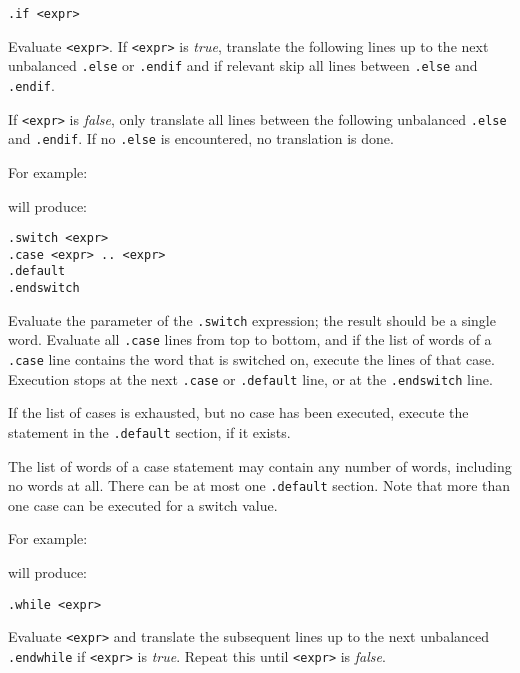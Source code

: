 \begin{verbatim}
.if <expr>
\end{verbatim}
\begin{desc}
Evaluate \texttt{<expr>}.
If \texttt{<expr>} is {\it true},
translate the following lines up to the next unbalanced
\texttt{.else} or \texttt{.endif}
and if relevant skip all lines between \texttt{.else} and \texttt{.endif}.

If \texttt{<expr>} is {\it false},
only translate all lines between the following unbalanced
\texttt{.else} and \texttt{.endif}.
If no \texttt{.else} is encountered, no translation is done.

For example:
\begin{showfile}

\end{showfile}
will produce:
\begin{showfile}

\end{showfile}
\end{desc}
\begin{verbatim}
.switch <expr>
.case <expr> .. <expr>
.default
.endswitch
\end{verbatim}
\begin{desc}
Evaluate the parameter of the \verb'.switch' expression; the result
should be a single word. Evaluate all \verb'.case' lines from top
to bottom, and if the list of words of a \verb'.case' line contains
the word that is switched on, execute the lines of that case.
Execution stops at the next \verb'.case' or \verb'.default' line,
or at the \verb'.endswitch' line.

If the list of cases is exhausted, but no case has been executed,
execute the statement in the \verb'.default' section, if it exists.

The list of words of a case statement may contain any number of words,
including no words at all. There can be at most one \verb'.default'
section. Note that more than one case can be executed for a switch value.

For example:
\begin{showfile}

\end{showfile}
will produce:
\begin{showfile}

\end{showfile}
\end{desc}
\begin{verbatim}
.while <expr>
\end{verbatim}
\begin{desc}
Evaluate \texttt{<expr>} and translate the subsequent lines up to the next
unbalanced \texttt{.endwhile} if \texttt{<expr>} is {\it true}.
Repeat this until \texttt{<expr>} is {\it false}.
\end{desc}

